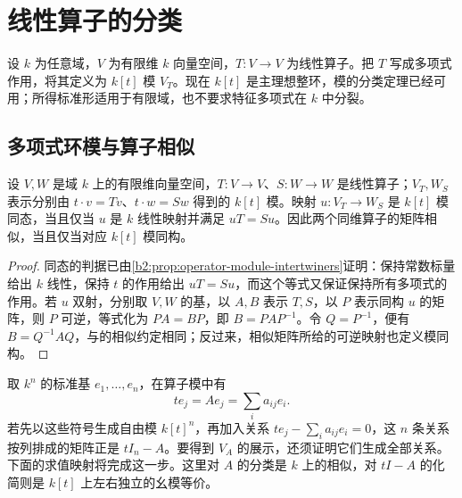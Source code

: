 
\section{线性算子的分类}
\label{b2:sec:0404}


设 \(k\) 为任意域，\(V\) 为有限维 \(k\) 向量空间，\(T:V\to V\) 为线性算子。把 \(T\) 写成多项式作用，将其定义为 \(k[t]\) 模 \(V_T\)。现在 \(k[t]\) 是主理想整环，模的分类定理已经可用；所得标准形适用于有限域，也不要求特征多项式在 \(k\) 中分裂。

\subsection{多项式环模与算子相似}
\label{b2:subsec:0404:01}

\begin{proposition}\label{b2:prop:operator-similarity-modules}
	设 \(V,W\) 是域 \(k\) 上的有限维向量空间，\(T:V\to V\)、\(S:W\to W\) 是线性算子；\(V_T,W_S\) 表示分别由 \(t\cdot v=Tv\)、\(t\cdot w=Sw\) 得到的 \(k[t]\) 模。映射 \(u:V_T\to W_S\) 是 \(k[t]\) 模同态，当且仅当 \(u\) 是 \(k\) 线性映射并满足 \(uT=Su\)。因此两个同维算子的矩阵相似，当且仅当对应 \(k[t]\) 模同构。
\end{proposition}
\begin{proof}
	同态的判据已由\cref{b2:prop:operator-module-intertwiners}证明：保持常数标量给出 \(k\) 线性，保持 \(t\) 的作用给出 \(uT=Su\)，而这个等式又保证保持所有多项式的作用。若 \(u\) 双射，分别取 \(V,W\) 的基，以 \(A,B\) 表示 \(T,S\)，以 \(P\) 表示同构 \(u\) 的矩阵，则 \(P\) 可逆，等式化为 \(PA=BP\)，即 \(B=PAP^{-1}\)。令 \(Q=P^{-1}\)，便有 \(B=Q^{-1}AQ\)，与的相似约定相同；反过来，相似矩阵所给的可逆映射也定义模同构。
\end{proof}

取 \(k^n\) 的标准基 \(e_1,\ldots,e_n\)，在算子模中有
\[
	te_j=Ae_j=\sum_i a_{ij}e_i.
\]
若先以这些符号生成自由模 \(k[t]^n\)，再加入关系 \(te_j-\sum_i a_{ij}e_i=0\)，这 \(n\) 条关系按列排成的矩阵正是 \(tI_n-A\)。要得到 \(V_A\) 的展示，还须证明它们生成全部关系。下面的求值映射将完成这一步。这里对 \(A\) 的分类是 \(k\) 上的相似，对 \(tI-A\) 的化简则是 \(k[t]\) 上左右独立的幺模等价。

